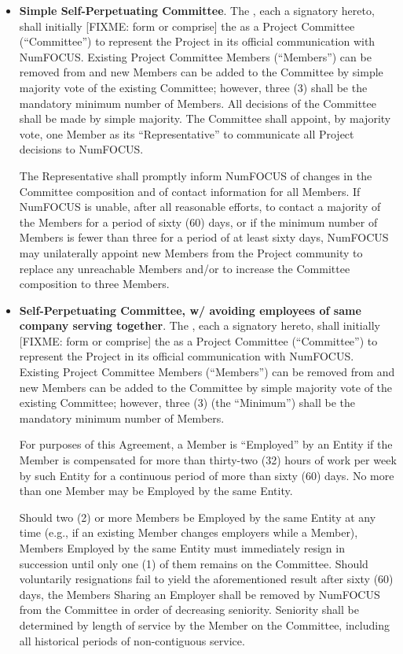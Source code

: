 \begin{itemize}

\item \textbf{Simple Self-Perpetuating Committee}. The \signatories{}, each a
  signatory hereto, shall initially [FIXME: form or comprise] the
  \leadershipbody{} as a Project Committee (``Committee'') to represent the
  Project in its official communication with NumFOCUS.  Existing Project
  Committee Members (``Members'') can be removed from and new Members can be
  added to the Committee by simple majority vote of the existing Committee;
  however, three (3) shall be the mandatory minimum number of Members. All
  decisions of the Committee shall be made by simple majority. The Committee
  shall appoint, by majority vote, one Member as its ``Representative'' to
  communicate all Project decisions to NumFOCUS.


The Representative shall promptly inform NumFOCUS of changes in the Committee
composition and of contact information for all Members.  If NumFOCUS is unable,
after all reasonable efforts, to contact a majority of the Members for a period
of sixty (60) days, or if the minimum number of Members is fewer than three for
a period of at least sixty days, NumFOCUS may unilaterally appoint new Members
from the Project community to replace any unreachable Members and/or to
increase the Committee composition to three Members.

\item \textbf{Self-Perpetuating Committee, w/ avoiding employees of same
  company serving together}. The \signatories{}, each a signatory hereto, shall
  initially [FIXME: form or comprise] the \leadershipbody{} as a Project
  Committee (``Committee'') to represent the Project in its official
  communication with NumFOCUS. Existing Project Committee Members (``Members'')
  can be removed from and new Members can be added to the Committee by simple
  majority vote of the existing Committee; however, three (3) (the ``Minimum'')
  shall be the mandatory minimum number of Members.


For purposes of this Agreement, a Member is ``Employed'' by an Entity if the
Member is compensated for more than thirty-two (32) hours of work per week by
such Entity for a continuous period of more than sixty (60) days. No more than
one Member may be Employed by the same Entity.


Should two (2) or more Members be Employed by the same Entity at any time
(e.g., if an existing Member changes employers while a Member), Members
Employed by the same Entity must immediately resign in succession until only
one (1) of them remains on the Committee. Should voluntarily resignations fail
to yield the aforementioned result after sixty (60) days, the Members Sharing
an Employer shall be removed by NumFOCUS from the Committee in order of
decreasing seniority. Seniority shall be determined by length of service by the
Member on the Committee, including all historical periods of non-contiguous
service.



\end{itemize}
